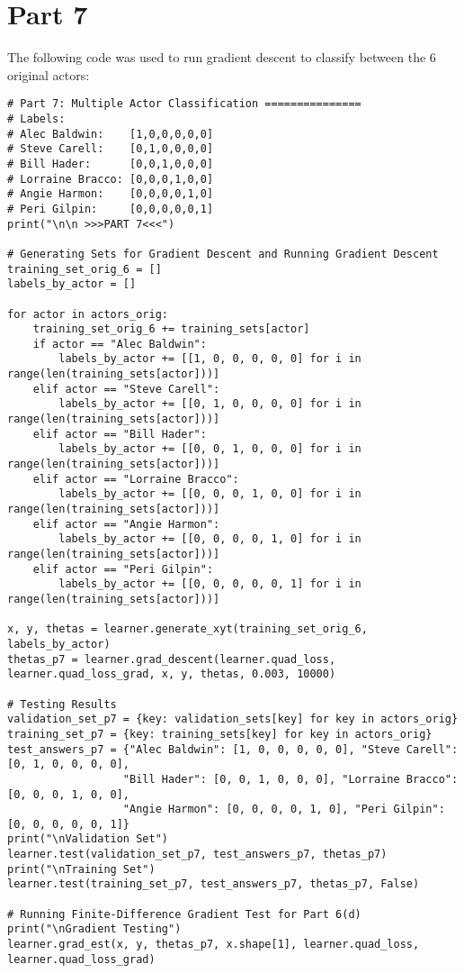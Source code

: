 \documentclass[11pt,a4paper]{report}
\begin{document}
\section*{Part 7}
The following code was used to run gradient descent to classify between the 6 original actors:
\begin{lstlisting}
# Part 7: Multiple Actor Classification ===============
# Labels:
# Alec Baldwin:    [1,0,0,0,0,0]
# Steve Carell:    [0,1,0,0,0,0]
# Bill Hader:      [0,0,1,0,0,0]
# Lorraine Bracco: [0,0,0,1,0,0]
# Angie Harmon:    [0,0,0,0,1,0]
# Peri Gilpin:     [0,0,0,0,0,1]
print("\n\n >>>PART 7<<<")

# Generating Sets for Gradient Descent and Running Gradient Descent
training_set_orig_6 = []
labels_by_actor = []

for actor in actors_orig:
    training_set_orig_6 += training_sets[actor]
    if actor == "Alec Baldwin":
        labels_by_actor += [[1, 0, 0, 0, 0, 0] for i in range(len(training_sets[actor]))]
    elif actor == "Steve Carell":
        labels_by_actor += [[0, 1, 0, 0, 0, 0] for i in range(len(training_sets[actor]))]
    elif actor == "Bill Hader":
        labels_by_actor += [[0, 0, 1, 0, 0, 0] for i in range(len(training_sets[actor]))]
    elif actor == "Lorraine Bracco":
        labels_by_actor += [[0, 0, 0, 1, 0, 0] for i in range(len(training_sets[actor]))]
    elif actor == "Angie Harmon":
        labels_by_actor += [[0, 0, 0, 0, 1, 0] for i in range(len(training_sets[actor]))]
    elif actor == "Peri Gilpin":
        labels_by_actor += [[0, 0, 0, 0, 0, 1] for i in range(len(training_sets[actor]))]

x, y, thetas = learner.generate_xyt(training_set_orig_6, labels_by_actor)
thetas_p7 = learner.grad_descent(learner.quad_loss, learner.quad_loss_grad, x, y, thetas, 0.003, 10000)

# Testing Results
validation_set_p7 = {key: validation_sets[key] for key in actors_orig}
training_set_p7 = {key: training_sets[key] for key in actors_orig}
test_answers_p7 = {"Alec Baldwin": [1, 0, 0, 0, 0, 0], "Steve Carell": [0, 1, 0, 0, 0, 0],
                  "Bill Hader": [0, 0, 1, 0, 0, 0], "Lorraine Bracco": [0, 0, 0, 1, 0, 0],
                  "Angie Harmon": [0, 0, 0, 0, 1, 0], "Peri Gilpin": [0, 0, 0, 0, 0, 1]}
print("\nValidation Set")
learner.test(validation_set_p7, test_answers_p7, thetas_p7)
print("\nTraining Set")
learner.test(training_set_p7, test_answers_p7, thetas_p7, False)

# Running Finite-Difference Gradient Test for Part 6(d)
print("\nGradient Testing")
learner.grad_est(x, y, thetas_p7, x.shape[1], learner.quad_loss, learner.quad_loss_grad)
\end{lstlisting}
\end{document}
